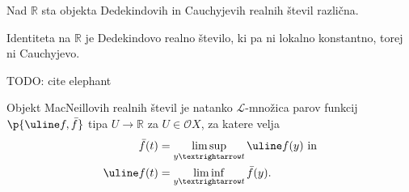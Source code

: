 \begin{trditev}
  Nad \(ℝ\) sta objekta Dedekindovih in Cauchyjevih realnih števil različna.
\end{trditev}
\begin{dokaz}
  Identiteta na \(ℝ\) je Dedekindovo realno število, ki pa ni lokalno
  konstantno, torej ni Cauchyjevo.
\end{dokaz}

TODO: cite elephant
\begin{trditev}\label{real:Rm-maps}
  Objekt MacNeillovih realnih števil je natanko \(ℒ\)-množica parov funkcij
  \(\p{\uline f, \bar f}\) tipa \(U → ℝ\) za \(U ∈ 𝒪X\), za katere velja
  \begin{align*}
    \bar   f(t) &=
    \limsup_{y → t}\uline f(y)\text{ in}\\
    \uline f(t) &=
    \liminf_{y → t}\bar   f(y)\text.
  \end{align*}
\end{trditev}
